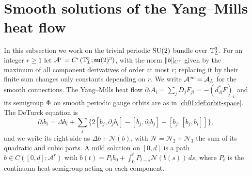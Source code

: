 \section{Smooth solutions of the Yang--Mills heat flow}\label{ch21:sec:continuum}

In this subsection we work on the trivial periodic $\mathrm{SU}(2)$ bundle over $\mathbb T_L^3$. For an integer $r\ge1$ let $\mathcal A^r=C^r(\mathbb T_L^3;\mathfrak{su}(2)^3)$, with the norm $\lVert b\rVert_{C^r}$ given by the maximum of all component derivatives of order at most $r$; replacing it by their finite sum changes only constants depending on $r$. We write $\mathcal A^\infty=\mathcal A_L$ for the smooth connections. The Yang--Mills heat flow $\partial_tA_i=\sum_jD_jF_{ji}=-(d_A^*F)_i$ and its semigroup $\Phi$ on smooth periodic gauge orbits are as in \cref{ch01:def:orbit-space}. The DeTurck equation is
\begin{equation}\label{ch21:eq:deturck}
 \partial_tb_i=\Delta b_i+\sum_j\bigl\{2[b_j,\partial_jb_i]-[b_j,\partial_ib_j]+[b_j,[b_j,b_i]]\bigr\},
\end{equation}
and we write its right side as $\Delta b+\mathscr N(b)$, with $\mathscr N=\mathscr N_2+\mathscr N_3$ the sum of its quadratic and cubic parts. A mild solution on $[0,d]$ is a path $b\in C([0,d];\mathcal A^r)$ with $b(t)=P_tb_0+\int_0^tP_{t-s}\mathscr N(b(s))\,ds$, where $P_t$ is the continuum heat semigroup acting on each component.

